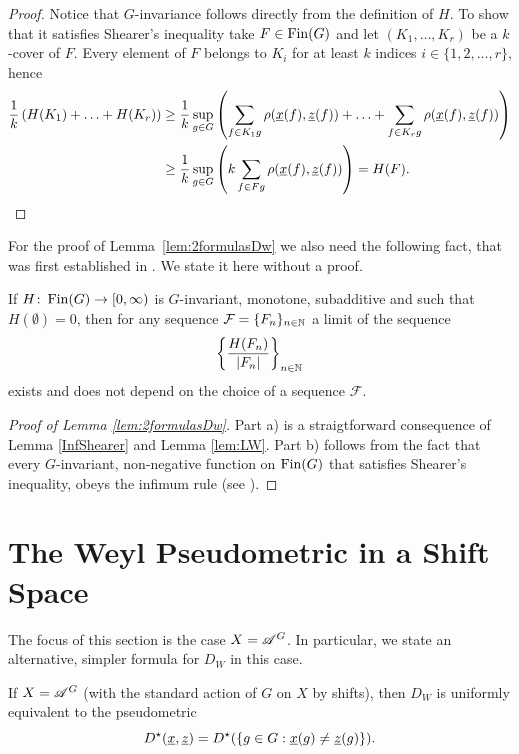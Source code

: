 \begin{proof}Notice that $G$-invariance follows directly from the definition of $H$. To show that it satisfies Shearer's inequality take $F\in\operatorname{Fin}(G)$ and let $(K_1,\ldots,K_r)$ be a $k$-cover of $F$. Every element of $F$ belongs to $K_i$ for at least $k$ indices $i\in\{1,2,\ldots,r\}$, hence
\begin{align*}
\frac{1}{k}\inparen{H(K_1)+\ldots +H(K_r)} &\geq \frac{1}{k} \sup_{g\in G}\inparen{\sum_{f\in K_1g} \rho (\und{x}(f),\und{z}(f))+\ldots+\sum_{f\in K_rg} \rho (\und{x}(f),\und{z}(f))}
\\
&\geq   \frac{1}{k}\sup_{g\in G}\inparen{k \sum_{f\in Fg} \rho (\und{x}(f),\und{z}(f))} %
= H(F). \qedhere
\end{align*}
\end{proof}
\noindent 
For the proof of Lemma~\ref{lem:2formulasDw} we also need the following fact, that was first established in \cite{LW00}. We state it here without a proof.
\begin{lem}[{\cite[Theorem 6.1]{LW00}}]\label{lem:LW}
If $H\colon\operatorname{Fin}(G)\to[0,\infty)$ is $G$-invariant, monotone, subadditive and such that $H(\emptyset)=0$, then for any \Folner sequence $\mathcal F=\{F_n\}_{n\in\mathbb{N}}$ a limit of the sequence
\[
\left\{\frac{H(F_n)}{|F_n|}\right\}_{n\in\mathbb{N}}
\]
exists and does not depend on the choice of a \Folner sequence $\mathcal F$.
\end{lem}

\begin{proof}[Proof of Lemma \ref{lem:2formulasDw}]
Part a) is a straigtforward consequence of Lemma \ref{InfShearer} and Lemma \ref{lem:LW}. 
Part b) follows from the fact that every $G$-invariant, non-negative function on $\operatorname{Fin}(G)$ that satisfies Shearer's inequality, obeys the infimum rule (see \cite[Proposition 3.3]{DFR16}).
\end{proof}


\section{The Weyl Pseudometric in a Shift Space}
The focus of this section is the case $X=\mathscr{A}^G$. In particular, we state an alternative, simpler formula for $D_W$ in this case.

\begin{thm}\label{thm:shift_equiv_weyl}
If $X=\mathscr{A}^G$ (with the standard action of $G$ on $X$ by shifts), then $D_W$  is uniformly equivalent to the pseudometric
\[
D^\star(\underline{x},\underline{z})=D^\star(\{g\in G : \underline{x}(g)\neq \underline{z}(g)\}).
\]
\end{thm}

